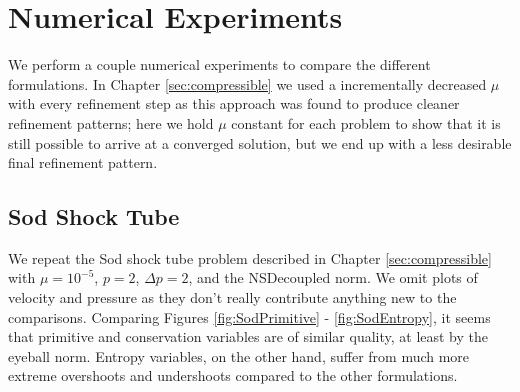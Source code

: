\documentclass[Dissertation.tex]{subfiles}
\begin{document}
\section{Numerical Experiments}
We perform a couple numerical experiments to compare the different formulations.
In Chapter \ref{sec:compressible} we used a incrementally decreased $\mu$ with every refinement step 
as this approach was found to produce cleaner refinement patterns; here we hold $\mu$ constant
for each problem to show that it is still possible to arrive at a converged solution, but
we end up with a less desirable final refinement pattern.

\subsection{Sod Shock Tube}
We repeat the Sod shock tube problem described in Chapter \ref{sec:compressible} with $\mu=10^{-5}$,
$p=2$, $\Delta p=2$, and the NSDecoupled norm.
We omit plots of velocity and pressure as they don't really contribute anything new to the comparisons.
Comparing Figures \ref{fig:SodPrimitive} - \ref{fig:SodEntropy}, it seems that
primitive and conservation variables are of similar quality, at least by the eyeball norm.
Entropy variables, on the other hand, suffer from much more extreme overshoots and 
undershoots compared to the other formulations.
\end{document}
